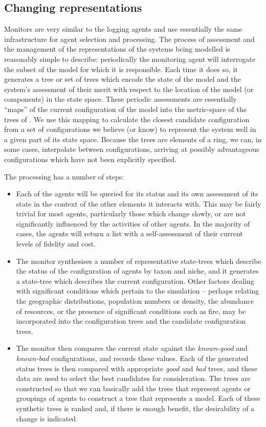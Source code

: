 \subsection{Changing representations}

Monitors are very similar to the logging agents and use essentially
the same infrastructure for agent selection and processing.  The
process of assessment and the management of the representations of the
systems being modelled is reasonably simple to describe: periodically
the monitoring agent will interrogate the subset of the model for
which it is responsible. Each time it does so, it generates a tree or
set of trees which encode the state of the model and the system's
assessment of their merit with respect to the location of the model
(or components) in the state space.  These periodic assessments are
essentially ``maps'' of the current configuration of the model into
the metric-space of the trees of \Cfour.  We use this mapping to
calculate the closest candidate configuration from a set of
configurations we believe (or know) to represent the system well in a
given part of its state space. Because the trees are elements of a
ring, we can, in some cases, interpolate between configurations,
arriving at possibly advantageous configurations which have not been
explicitly specified.

The processing has a number of steps:
\begin{itemize}
\item[] Each of the agents will be queried for its status
and its own assessment of its state in the context of the other
elements it interacts with.  This may be fairly trivial for most
agents, particularly those which change slowly, or are not
significantly influenced by the activities of other agents.
In the majority of cases, the agents will return a list with a
self-assessment of their current levels of fidelity and cost.
\item[] The monitor synthesises a number of representative
state-trees which describe the status of the configuration of agents
by taxon and niche, and it generates a state-tree which describes the
current configuration. Other factors dealing with significant
conditions which pertain to the simulation -- perhaps relating the
geographic distributions, population numbers or density, the abundance
of resources, or the presence of significant conditions such as fire,
may be incorporated into the configuration trees and the candidate
configuration trees.
\item[] The monitor then compares the current state against
the \emph{known-good} and \emph{known-bad} configurations, and records
these values.  Each of the generated status trees is then compared
with appropriate \emph{good} and \emph{bad} trees, and these data are
used to select the best candidates for consideration.  The trees are
constructed so that we can basically add the trees that represent
agents or groupings of agents to construct a tree that represents a
model. Each of these synthetic trees is ranked and, if there is enough
benefit, the desirability of a change is indicated.
\end{itemize}


